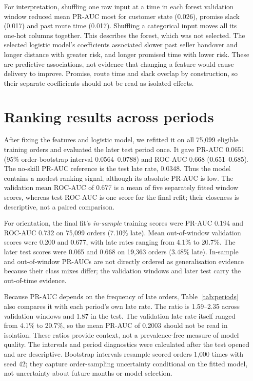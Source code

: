 \documentclass[12pt,a4paper]{article}
\begin{document}
For interpretation, shuffling one raw input at a time in each forest validation window reduced mean PR-AUC most for customer state (0.026), promise slack (0.017) and past route time (0.017). Shuffling a categorical input moves all its one-hot columns together. This describes the forest, which was not selected. The selected logistic model's coefficients associated slower past seller handover and longer distance with greater risk, and longer promised time with lower risk. These are predictive associations, not evidence that changing a feature would cause delivery to improve. Promise, route time and slack overlap by construction, so their separate coefficients should not be read as isolated effects.

\section*{Ranking results across periods}
After fixing the features and logistic model, we refitted it on all 75,099 eligible training orders and evaluated the later test period once. It gave PR-AUC 0.0651 (95\% order-bootstrap interval 0.0564--0.0788) and ROC-AUC 0.668 (0.651--0.685). The no-skill PR-AUC reference is the test late rate, 0.0348. Thus the model contains a modest ranking signal, although its absolute PR-AUC is low. The validation mean ROC-AUC of 0.677 is a mean of five separately fitted window scores, whereas test ROC-AUC is one score for the final refit; their closeness is descriptive, not a paired comparison.

For orientation, the final fit's \emph{in-sample} training scores were PR-AUC 0.194 and ROC-AUC 0.732 on 75,099 orders (7.10\% late). Mean out-of-window validation scores were 0.200 and 0.677, with late rates ranging from 4.1\% to 20.7\%. The later test scores were 0.065 and 0.668 on 19,363 orders (3.48\% late). In-sample and out-of-window PR-AUCs are not directly ordered as generalisation evidence because their class mixes differ; the validation windows and later test carry the out-of-time evidence.

Because PR-AUC depends on the frequency of late orders, Table~\ref{tab:periods} also compares it with each period's own late rate. The ratio is 1.59--2.35 across validation windows and 1.87 in the test. The validation late rate itself ranged from 4.1\% to 20.7\%, so the mean PR-AUC of 0.2003 should not be read in isolation. These ratios provide context, not a prevalence-free measure of model quality. The intervals and period diagnostics were calculated after the test opened and are descriptive. Bootstrap intervals resample scored orders 1,000 times with seed 42; they capture order-sampling uncertainty conditional on the fitted model, not uncertainty about future months or model selection.
\end{document}

